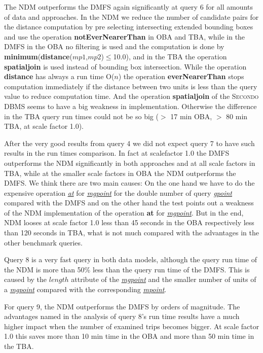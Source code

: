 \documentclass[a4paper]{article}
\newcommand{\secondo}{\textsc{Secondo}}
\newcommand{\op}[1]{\textbf{#1}}
\newcommand{\dt}[1]{\textsl{\underline{#1}}}
\begin{document}
{The NDM outperforms the DMFS again significantly at query 6
for all amounts of data and approaches. In the NDM we reduce the number of candidate
pairs for the distance computation by pre selecting intersecting extended bounding boxes
and use the operation \op{notEverNearerThan} in OBA and TBA, while in the DMFS
in the OBA no filtering is used and the computation is done by
\op{minimum}(\op{distance}($mp1$,$mp2$)$\leq$10.0), and in the TBA the operation
\op{spatialjoin} is used instead of bounding box intersection. While the operation
\op{distance} has always a run time O($n$) the operation \op{everNearerThan}
stops computation immediately if the distance between two units is less than the
query value to reduce computation time. And the operation \op{spatialjoin} of the
\secondo{} DBMS seems to have a big weakness in implementation. Otherwise the
difference in the TBA query run times could not be so big ($>$ 17 min OBA, $>$
80 min TBA, at scale factor 1.0).

After the very good results from query 4 we did not expect query 7 to have such
results in the run times comparison. In fact at scalefactor 1.0 the DMFS outperforms
the NDM significantly in both
approaches and at all scale factors in TBA, while at the smaller scale factors in
OBA the NDM outperforms the DMFS. We think there are two main causes: On the one hand we
have to do the expensive operation \dt{at} for \dt{mgpoint} for the double number
of query \dt{gpoint} compared with the DMFS and
on the other hand the test points out a weakness of the NDM
implementation of the operation \op{at} for \dt{mgpoint}. But in the end, NDM looses
at scale factor 1.0 less than 45 seconds in the OBA respectively less
than 120 seconds in TBA, what is not much compared with the advantages in the
other benchmark queries.

Query 8 is a very fast query in both data models, although the query run time of
the NDM is more than 50\% less than the query run time of the
DMFS. This is caused by the
$length$ attribute of the \dt{mgpoint} and the smaller number of units of a
\dt{mgpoint} compared with the corresponding \dt{mpoint}.

For query 9, the NDM outperforms the DMFS by orders of magnitude. The advantages
named in the analysis of query 8's run time results have a much higher impact
when the number of examined trips becomes bigger. At scale factor 1.0 this saves
more than 10 min time in the OBA and more than 50 min time in the TBA.

}
\end{document}
